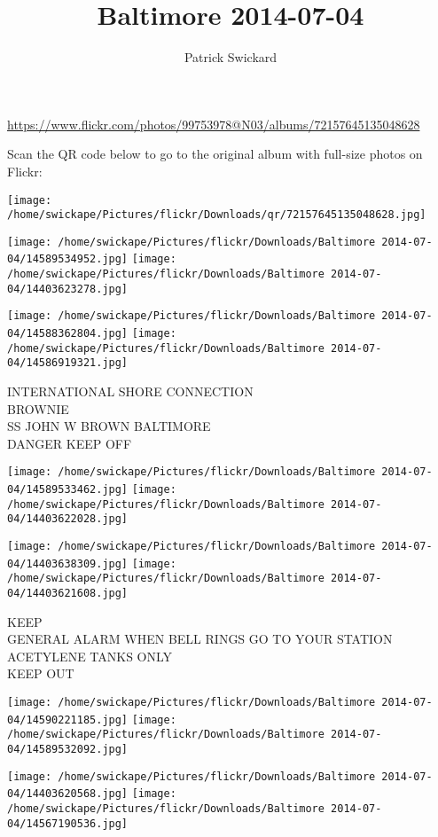 \documentclass[10pt,letterpaper]{article}
\title{Baltimore 2014-07-04}
\author{Patrick Swickard}
\date{}
\begin{document}
\maketitle

\url{https://www.flickr.com/photos/99753978@N03/albums/72157645135048628}

Scan the QR code below to go to the original album with full-size photos on Flickr:

\texttt{[image: /home/swickape/Pictures/flickr/Downloads/qr/72157645135048628.jpg]}
\pagebreak

\texttt{[image: /home/swickape/Pictures/flickr/Downloads/Baltimore 2014-07-04/14589534952.jpg]}
\texttt{[image: /home/swickape/Pictures/flickr/Downloads/Baltimore 2014-07-04/14403623278.jpg]}

\texttt{[image: /home/swickape/Pictures/flickr/Downloads/Baltimore 2014-07-04/14588362804.jpg]}
\texttt{[image: /home/swickape/Pictures/flickr/Downloads/Baltimore 2014-07-04/14586919321.jpg]}

INTERNATIONAL SHORE CONNECTION\\
BROWNIE\\
SS JOHN W BROWN BALTIMORE\\
DANGER KEEP OFF
\pagebreak

\texttt{[image: /home/swickape/Pictures/flickr/Downloads/Baltimore 2014-07-04/14589533462.jpg]}
\texttt{[image: /home/swickape/Pictures/flickr/Downloads/Baltimore 2014-07-04/14403622028.jpg]}

\texttt{[image: /home/swickape/Pictures/flickr/Downloads/Baltimore 2014-07-04/14403638309.jpg]}
\texttt{[image: /home/swickape/Pictures/flickr/Downloads/Baltimore 2014-07-04/14403621608.jpg]}

KEEP\\
GENERAL ALARM WHEN BELL RINGS GO TO YOUR STATION\\
ACETYLENE TANKS ONLY\\
KEEP OUT
\pagebreak

\texttt{[image: /home/swickape/Pictures/flickr/Downloads/Baltimore 2014-07-04/14590221185.jpg]}
\texttt{[image: /home/swickape/Pictures/flickr/Downloads/Baltimore 2014-07-04/14589532092.jpg]}

\texttt{[image: /home/swickape/Pictures/flickr/Downloads/Baltimore 2014-07-04/14403620568.jpg]}
\texttt{[image: /home/swickape/Pictures/flickr/Downloads/Baltimore 2014-07-04/14567190536.jpg]}
\end{document}
